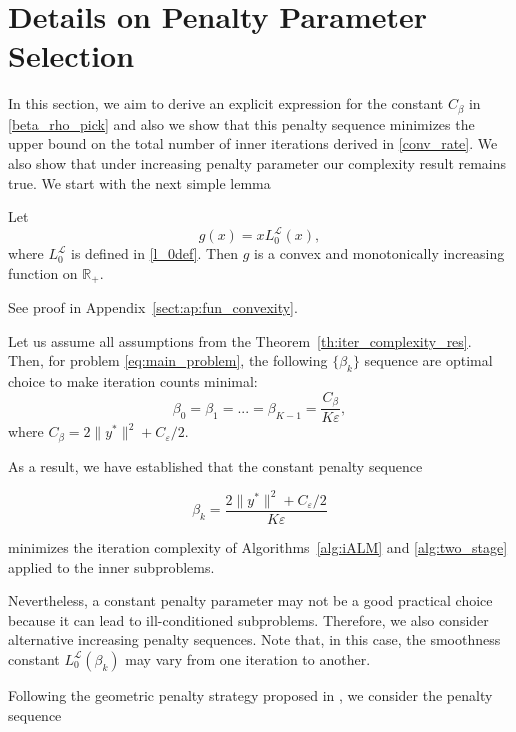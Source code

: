\documentclass[runningheads]{llncs}
\begin{document}
	\section{Details on Penalty Parameter Selection}\label{sect:details_pen_par}
	In this section, we aim to derive an explicit expression for the constant $C_\beta$ in \eqref{beta_rho_pick} and also we show that this penalty sequence minimizes the upper bound on the total number of inner iterations derived in \eqref{conv_rate}. We also show that under increasing penalty parameter our complexity result remains true. We start with the next simple lemma
	
	\begin{lemma}\label{lem:fun_convexity}
		Let
		\[
		g(x)=xL_0^{\mathcal L}(x),
		\]
		where $L_0^{\mathcal L}$ is defined in \eqref{l_0def}. Then $g$ is a convex and monotonically increasing function on $\mathbb{R}_+$.
	\end{lemma}
	
	See proof in Appendix~\ref{sect:ap:fun_convexity}.
	
	\begin{proposition}\label{prop:optimal_beta}
		Let us assume all assumptions from the Theorem~\ref{th:iter_complexity_res}. Then, for problem \ref{eq:main_problem}, the following $\{ \beta_k \}$ sequence are optimal choice to make iteration counts minimal:
		\begin{equation*}
			\beta_0 = \beta_1 = ... = \beta_{K-1} = \frac{C_\beta}{K \varepsilon},
		\end{equation*}
		where $C_\beta = 2 \| y^* \|^2 + C_\varepsilon / 2$.
	\end{proposition}
	
	As a result, we have established that the constant penalty sequence

	\[
	\boxed{\beta_k=\frac{2\|y^*\|^2+C_\varepsilon/2}{K\varepsilon}}
	\]
	
	minimizes the iteration complexity of Algorithms~\ref{alg:iALM} and \ref{alg:two_stage} applied to the inner subproblems.
	
	Nevertheless, a constant penalty parameter may not be a good practical choice because it can lead to ill-conditioned subproblems. Therefore, we also consider alternative increasing penalty sequences. Note that, in this case, the smoothness constant $L_0^{\mathcal L}(\beta_k)$ may vary from one iteration to another.
	
	Following the geometric penalty strategy proposed in \cite{xu2021iteration}, we consider the penalty sequence
	
\end{document}

